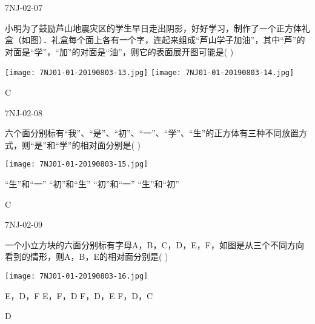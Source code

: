 \begin{defproblem}{7NJ-02-07}%
\begin{onlyproblem}%
小明为了鼓励芦山地震灾区的学生早日走出阴影，好好学习，制作了一个正方体礼盒（如图）．礼盒每个面上各有一个字，连起来组成“芦山学子加油”，其中“芦”的对面是“学”，“加”的对面是“油”，则它的表面展开图可能是(    ) 
\begin{center}
\texttt{[image: 7NJ01-01-20190803-13.jpg]}
\texttt{[image: 7NJ01-01-20190803-14.jpg]}
\end{center}


\end{onlyproblem}%
\begin{onlysolution}%
\begin{solution}%
C
\end{solution}%
\end{onlysolution}%
\end{defproblem}




\begin{defproblem}{7NJ-02-08}%
\begin{onlyproblem}%
六个面分别标有“我”、“是”、“初”、“一”、“学”、“生”的正方体有三种不同放置方式，则“是”和“学”的相对面分别是(    ) 
\begin{center}
\texttt{[image: 7NJ01-01-20190803-15.jpg]}
\end{center}

\xx
{“生”和“一”}
{“初”和“生”}
{“初”和“一”}
{“生”和“初”}   


\end{onlyproblem}%
\begin{onlysolution}%
\begin{solution}%
C
\end{solution}%
\end{onlysolution}%
\end{defproblem}



\begin{defproblem}{7NJ-02-09}%
\begin{onlyproblem}%
一个小立方块的六面分别标有字母A，B，C，D，E，F，如图是从三个不同方向看到的情形，则A，B，E的相对面分别是(    ) 
\begin{center}
\texttt{[image: 7NJ01-01-20190803-16.jpg]}
\end{center}

\xx
{E，D，F}
{E，F，D}
{F，D，E}
{F，D，C}


\end{onlyproblem}%
\begin{onlysolution}%
\begin{solution}%
D
\end{solution}%
\end{onlysolution}%
\end{defproblem}




